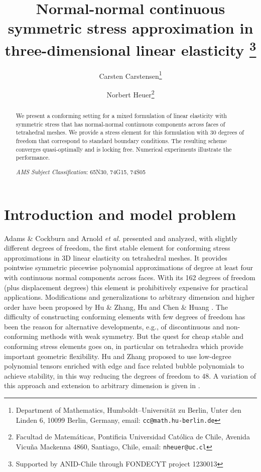\documentclass[11pt]{article}
\date{}
\title{Normal-normal continuous symmetric stress approximation in three-dimensional
       linear elasticity
\thanks{Supported by ANID-Chile through FONDECYT project 1230013}}
\author{
Carsten Carstensen\thanks{
Department of Mathematics, Humboldt--Universit\"at zu Berlin,
Unter den Linden 6, 10099 Berlin, Germany,
email: {\tt cc@math.hu-berlin.de}}
\and
Norbert Heuer\thanks{
Facultad de Matem\'aticas, Pontificia Universidad Cat\'olica de Chile,
Avenida Vicu\~na Mackenna 4860, Santiago, Chile,
email: {\tt nheuer@uc.cl}}}
\begin{document}
\maketitle
\begin{abstract}
We present a conforming setting for a mixed formulation of linear elasticity
with symmetric stress that has normal-normal continuous components across
faces of tetrahedral meshes. We provide a stress element for this formulation
with $30$ degrees of freedom that correspond to standard boundary conditions.
The resulting scheme converges quasi-optimally and is locking free.
Numerical experiments illustrate the performance.

\bigskip
\noindent
{\em AMS Subject Classification}:
65N30, %
74G15, %
74S05  %
\end{abstract}

\section{Introduction and model problem}

Adams \& Cockburn \cite{AdamsC_05_MFE} and Arnold \emph{et al.} \cite{ArnoldAW_08_FES}
presented and analyzed, with slightly different degrees of freedom,
the first stable element for conforming stress approximations
in 3D linear elasticity on tetrahedral meshes.
It provides pointwise symmetric piecewise polynomial approximations
of degree at least four with continuous normal components across faces.
With its 162 degrees of freedom (plus displacement degrees) this element is prohibitively
expensive for practical applications. Modifications and generalizations to
arbitrary dimension and higher order have been proposed by Hu \& Zhang, Hu
\cite{HuZ_15_FSM,Hu_15_FEA} and Chen \& Huang \cite{ChenH_22_FEDb}.
The difficulty of constructing conforming elements
with few degrees of freedom has been the reason for alternative developments,
e.g., of discontinuous and non-conforming methods with weak symmetry.
But the quest for cheap stable and conforming stress elements goes on,
in particular on tetrahedra which provide important geometric flexibility.
Hu and Zhang \cite{HuZ_16_FEA} proposed to use low-degree polynomial
tensors enriched with edge and face related bubble polynomials to achieve
stability, in this way reducing the degrees of freedom to $48$.
A variation of this approach and extension to arbitrary dimension is given in \cite{HuangZZZ_24_NLO}.
\end{document}

